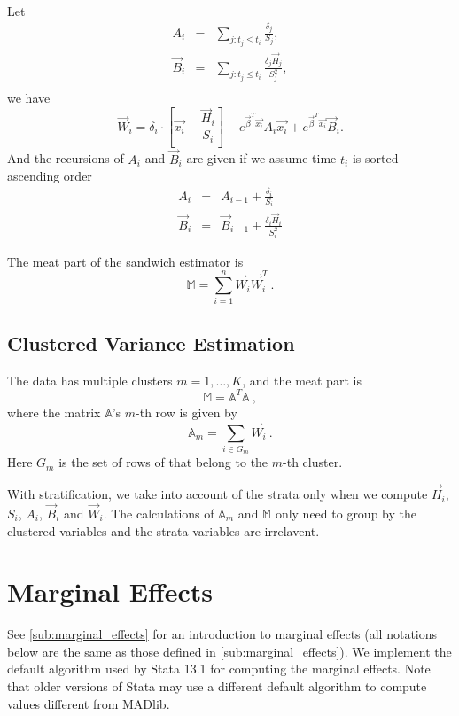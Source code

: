 Let
\begin{eqnarray*}
    A_i &=& \sum_{j: t_j \le t_i} \frac{\delta_j}{S_j},\\
    \vec{B}_i &=& \sum_{j: t_j \le t_i} \frac{\delta_j \vec{H}_j}{S_j^2},\\
\end{eqnarray*}
we have
\[
\vec{W}_i = \delta_i \cdot \left[ \vec{x_i} - \frac{\vec{H}_i}{S_i} \right] - e^{\vec{\beta}^T \vec{x_i}} A_i \vec{x_i} + e^{\vec{\beta}^T \vec{x_i}} \vec{B}_i.
\]
And the recursions of $A_i$ and $\vec{B}_i$ are given if we assume time $t_i$ is
sorted ascending order
\begin{eqnarray*}
    A_i &=& A_{i-1} + \frac{\delta_i}{S_i}\\
    \vec{B}_i &=& \vec{B}_{i-1} + \frac{\delta_i \vec{H}_i}{S_i^2}
\end{eqnarray*}

The meat part of the sandwich estimator is
\begin{equation}
  \mathbb{M} = \sum_{i=1}^n\vec{W}_i\vec{W}_i^T\ .
\end{equation}

\subsection{Clustered Variance Estimation}

The data has multiple clusters $m=1,\dots,K$, and the meat part is
\begin{equation}
  \mathbb{M} = \mathbb{A}^T\mathbb{A}\ ,
\end{equation}
where the matrix $\mathbb{A}$'s $m$-th row is given by
\begin{equation}
  \mathbb{A}_m = \sum_{i\in G_m} \vec{W}_i\ .
\end{equation}
Here $G_m$ is the set of rows of that belong to the $m$-th cluster.

With stratification, we take into account of the strata only when we
compute $\vec{H}_i$, $S_i$, $A_i$, $\vec{B}_i$ and $\vec{W}_i$. The
calculations of $\mathbb{A}_m$ and $\mathbb{M}$ only need to group by
the clustered variables and the strata variables are irrelavent.

\section{Marginal Effects}

See \ref{sub:marginal_effects} for an introduction to marginal effects
(all notations below are the same as those defined in \ref{sub:marginal_effects}).
We implement the default algorithm used by Stata 13.1 for computing the
marginal effects. Note that older versions of Stata may use a
different default algorithm to compute values different from MADlib.


